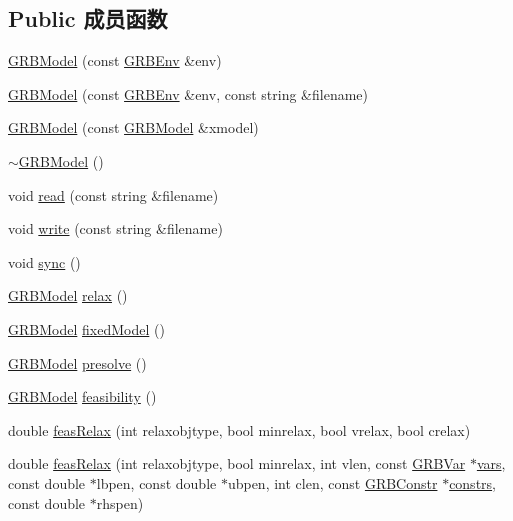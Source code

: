 \subsection*{Public 成员函数}
\begin{DoxyCompactItemize}
\item 
\hyperlink{classGRBModel_a026d67cfd0800caceb46aacb08edf2ef}{G\+R\+B\+Model} (const \hyperlink{classGRBEnv}{G\+R\+B\+Env} \&env)
\item 
\hyperlink{classGRBModel_ab3f639bddd431df6a898cb3dd08f30d2}{G\+R\+B\+Model} (const \hyperlink{classGRBEnv}{G\+R\+B\+Env} \&env, const string \&filename)
\item 
\hyperlink{classGRBModel_ace55e91735a6583c414c8e1268848fc2}{G\+R\+B\+Model} (const \hyperlink{classGRBModel}{G\+R\+B\+Model} \&xmodel)
\item 
\hyperlink{classGRBModel_ab896389fae051821a84dc914cb1bbb3d}{$\sim$\+G\+R\+B\+Model} ()
\item 
void \hyperlink{classGRBModel_a576fef8ddfcd26755547e715b25bc047}{read} (const string \&filename)
\item 
void \hyperlink{classGRBModel_a0e9bcc54f46939c7e55987c594645533}{write} (const string \&filename)
\item 
void \hyperlink{classGRBModel_a33c526935bc1c6fa329e28d74d132d64}{sync} ()
\item 
\hyperlink{classGRBModel}{G\+R\+B\+Model} \hyperlink{classGRBModel_adc85a6f51fb2b1847bdbfdcffc0c8154}{relax} ()
\item 
\hyperlink{classGRBModel}{G\+R\+B\+Model} \hyperlink{classGRBModel_ad696fc9087efbb57f3e1f4974c709bb7}{fixed\+Model} ()
\item 
\hyperlink{classGRBModel}{G\+R\+B\+Model} \hyperlink{classGRBModel_ac864af8e2453f73995890c62f403fe10}{presolve} ()
\item 
\hyperlink{classGRBModel}{G\+R\+B\+Model} \hyperlink{classGRBModel_a14e4d07e39aa57662a33e5c098777068}{feasibility} ()
\item 
double \hyperlink{classGRBModel_a0082e0bba4d3dbff4db471c49e0cf69e}{feas\+Relax} (int relaxobjtype, bool minrelax, bool vrelax, bool crelax)
\item 
double \hyperlink{classGRBModel_adc968bc539fe3ee0bd95baf44ed03697}{feas\+Relax} (int relaxobjtype, bool minrelax, int vlen, const \hyperlink{classGRBVar}{G\+R\+B\+Var} $\ast$\hyperlink{classGRBModel_a96d3ba518278642c7b13b74ad9bc7f7e}{vars}, const double $\ast$lbpen, const double $\ast$ubpen, int clen, const \hyperlink{classGRBConstr}{G\+R\+B\+Constr} $\ast$\hyperlink{classGRBModel_a755e1d5f050c0244720ccca9610a1e02}{constrs}, const double $\ast$rhspen)

\end{DoxyCompactItemize}
